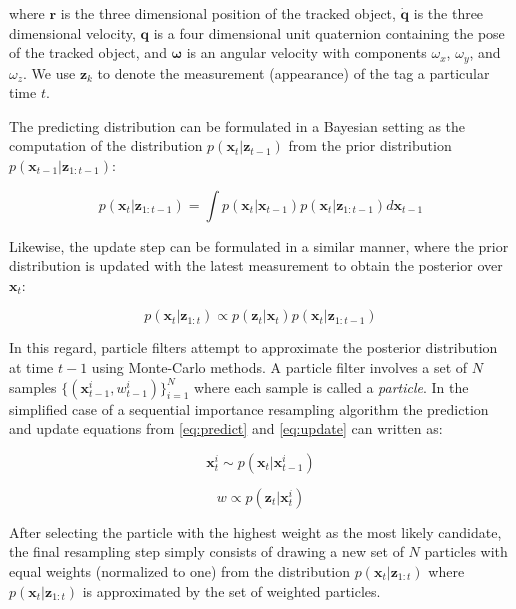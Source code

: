 \documentclass[letterpaper, 10 pt, conference]{ieeeconf}
\renewcommand{\vec}[1]{\boldsymbol{#1}}
\begin{document}
where $\vec{r}$ is the three dimensional position of the tracked object, $\dot{\vec{q}}$ is the three dimensional velocity, $\vec{q}$ is a four dimensional unit quaternion containing the pose of the tracked object, and $\vec{\omega}$ is an angular velocity with components $\omega_x$, $\omega_y$, and $\omega_z$. We use $\vec{z}_k$ to denote the measurement (appearance) of the tag a particular time $t$. 

The predicting distribution can be formulated in a Bayesian setting as the computation of the distribution $p(\vec{x}_t|\vec{z}_{t-1})$ from the prior distribution $p(\vec{x}_{t-1}|\vec{z}_{1:t-1})$:

\begin{equation} \label{eq:predict}
p(\vec{x}_t|\vec{z}_{1:t-1}) = \int p(\vec{x}_t | \vec{x}_{t-1})p(\vec{x}_t|\vec{z}_{1:t-1})d\vec{x}_{t-1}
\end{equation}

Likewise, the update step can be formulated in a similar manner, where the prior distribution is updated with the latest measurement to obtain the posterior over $\vec{x}_t$:

\begin{equation} \label{eq:update}
p(\vec{x}_t|\vec{z}_{1:t}) \propto p(\vec{z}_t|\vec{x}_t)p(\vec{x}_t|\vec{z}_{1:t-1})
\end{equation}

In this regard, particle filters attempt to approximate the posterior distribution at time $t-1$ using Monte-Carlo methods. A particle filter involves a set of $N$ samples $\{ (\vec{x}^i_{t-1}, w^i_{t-1}) \}_{i=1}^N$ where each sample is called a \emph{particle}. In the simplified case of a sequential importance resampling algorithm the prediction and update equations from \ref{eq:predict} and \ref{eq:update} can written as:

\begin{equation}
	\vec{x}^i_t \sim p(\vec{x}_t|\vec{x}^i_{t-1})
\end{equation}

\begin{equation}
	w \propto p(\vec{z}_t|\vec{x}^i_t)
\end{equation}

After selecting the particle with the highest weight as the most likely candidate, the final resampling step simply consists of drawing a new set of $N$ particles with equal weights (normalized to one) from the distribution $p(\vec{x}_t|\vec{z}_{1:t})$ where $p(\vec{x}_t|\vec{z}_{1:t})$ is approximated by the set of weighted particles.
\end{document}
